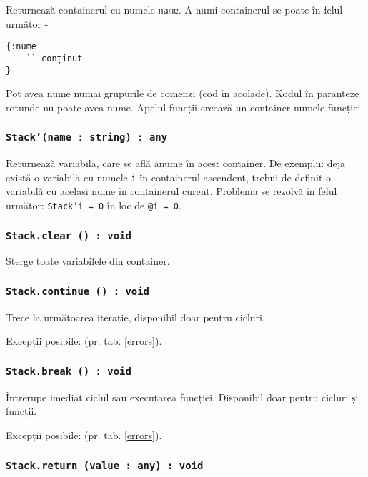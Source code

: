 Returnează containerul cu numele \texttt{name}. A numi containerul se poate în felul următor -
\begin{verbatim}
{:nume
	`` conținut
}
\end{verbatim}
Pot avea nume numai grupurile de comenzi (cod în acolade). Kodul în paranteze rotunde nu poate avea nume. Apelul funcții creează un container numele funcției.


\subsubsection{\texttt{Stack'(name : string) : any}}

Returnează variabila, care se află anume în acest container. De exemplu: deja există o variabilă cu numele \texttt{i} în containerul ascendent, trebui de definit o variabilă cu același nume în containerul curent. Problema se rezolvă în felul următor: \texttt{Stack'i = 0} în loc de \texttt{@i = 0}.

\subsubsection{\texttt{Stack.clear () : void}}

Șterge toate variabilele din container.

\subsubsection{\texttt{Stack.continue () : void}}

Trece la următoarea iterație, disponibil doar pentru cicluri.

Excepții posibile:  (pr. tab. \ref{errors}).

\subsubsection{\texttt{Stack.break () : void}}

Întrerupe imediat ciclul sau executarea funcției. Disponibil doar pentru cicluri și funcții.

Excepții posibile:  (pr. tab. \ref{errors}).

\subsubsection{\texttt{Stack.return (value : any) : void}}

